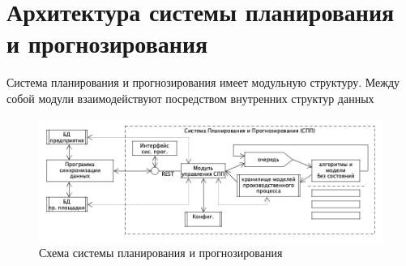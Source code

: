 \section{Архитектура системы планирования и прогнозирования}
\indent Система планирования и прогнозирования имеет модульную структуру.
Между собой модули взаимодействуют посредством внутренних структур данных

\begin{figure}[ht]
	\centering
	\includegraphics[width=\linewidth]{pics/archSPP.png}
	\caption{Схема системы планирования и прогнозирования \cite{niorkpz}}
	\label{fig:archSPP}
\end{figure}


